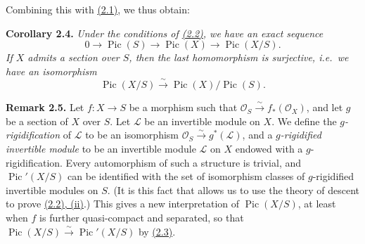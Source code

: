 \documentclass{article}
\newenvironment{itenv}[1]
  {\phantomsection\par\smallskip\noindent\textbf{#1.}\itshape}
  {\par\smallskip}
\newenvironment{rmenv}[1]
  {\phantomsection\par\smallskip\noindent\textbf{#1.}\rmfamily}
  {\par\smallskip}
\theoremstyle{definition}
\theoremstyle{definition}
\theoremstyle{definition}
\theoremstyle{definition}
\theoremstyle{remark}
\begin{document}
Combining this with \protect\hyperlink{fga-3-v-proposition-2.1}{(2.1)}, we thus obtain:

\leavevmode{}%
\begin{itenv}{Corollary 2.4}
Under the conditions of \protect\hyperlink{fga-3-v-proposition-2.2}{(2.2)}, we have an exact sequence
\[
  0
  \to \operatorname{Pic}(S)
  \to \operatorname{Pic}(X)
  \to \operatorname{Pic}(X/S).
\]
If \(X\) admits a section over \(S\), then the last homomorphism is surjective, i.e.~we have an isomorphism
\[
  \operatorname{Pic}(X/S)
  \xrightarrow{\sim}\operatorname{Pic}(X)/\operatorname{Pic}(S).
\]

\end{itenv}

\leavevmode{}%
\begin{rmenv}{Remark 2.5}
Let \(f\colon X\to S\) be a morphism such that \({\mathscr{O}}_S\xrightarrow{\sim}f_*({\mathscr{O}}_X)\), and let \(g\) be a section of \(X\) over \(S\).
Let \({\mathscr{L}}\) be an invertible module on \(X\).
We define the \emph{\(g\)-rigidification} of \({\mathscr{L}}\) to be an isomorphism \({\mathscr{O}}_S\xrightarrow{\sim}g^*({\mathscr{L}})\), and a \emph{\(g\)-rigidified invertible module} to be an invertible module \({\mathscr{L}}\) on \(X\) endowed with a \(g\)-rigidification.
Every automorphism of such a structure is trivial, and \(\operatorname{Pic}'(X/S)\) can be identified with the set of isomorphism classes of \(g\)-rigidified invertible modules on \(S\).
(It is this fact that allows us to use the theory of descent to prove \protect\hyperlink{fga-3-v-proposition-2.2}{(2.2), (ii)}.)
This gives a new interpretation of \(\operatorname{Pic}(X/S)\), at least when \(f\) is further quasi-compact and separated, so that \(\operatorname{Pic}(X/S)\xrightarrow{\sim}\operatorname{Pic}'(X/S)\) by \protect\hyperlink{fga-3-v-corollary-2.3}{(2.3)}.

\end{rmenv}
\end{document}
